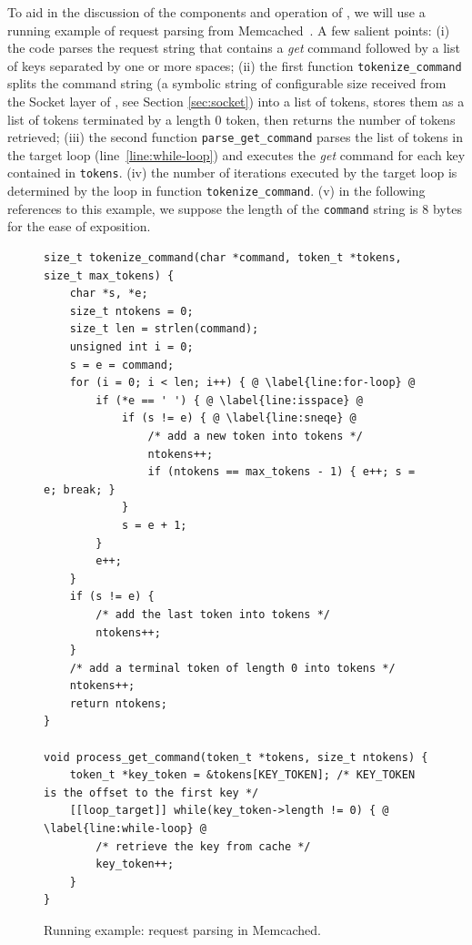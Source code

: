 To aid in the discussion of the components and operation of \lancet, we will use a running example of request parsing from Memcached~\cite{memcached}. A few salient points:
(i) the code parses the request string that contains a {\em get} command followed by a list of keys separated by one or more spaces;
(ii) the first function {\tt tokenize\_command} splits the command string (a symbolic string of configurable size received from the Socket layer of \lancet, see Section \ref{sec:socket}) into a list of tokens, stores them as a list of tokens terminated by a length 0 token, then returns the number of tokens retrieved;
(iii) the second function {\tt parse\_get\_command} parses the list of tokens in the target loop (line~\ref{line:while-loop}) and executes the {\em get} command for each key contained in {\tt tokens}.
(iv) the number of iterations executed by the target loop is determined by the loop in function {\tt tokenize\_command}.
(v) in the following references to this example, we suppose the length of the {\tt command} string is 8 bytes for the ease of exposition.

\begin{figure}[tbp]
\centering
\begin{lstlisting}
size_t tokenize_command(char *command, token_t *tokens, size_t max_tokens) {
    char *s, *e;
    size_t ntokens = 0;
    size_t len = strlen(command);
    unsigned int i = 0;
    s = e = command;
    for (i = 0; i < len; i++) { @ \label{line:for-loop} @
        if (*e == ' ') { @ \label{line:isspace} @
            if (s != e) { @ \label{line:sneqe} @
                /* add a new token into tokens */
                ntokens++;
                if (ntokens == max_tokens - 1) { e++; s = e; break; }
            }
            s = e + 1;
        }
        e++;
    }
    if (s != e) {
        /* add the last token into tokens */
        ntokens++;
    }
    /* add a terminal token of length 0 into tokens */
    ntokens++;
    return ntokens;
}

void process_get_command(token_t *tokens, size_t ntokens) {
    token_t *key_token = &tokens[KEY_TOKEN]; /* KEY_TOKEN is the offset to the first key */
    [[loop_target]] while(key_token->length != 0) { @ \label{line:while-loop} @
        /* retrieve the key from cache */
        key_token++;
    }
}
\end{lstlisting}
\caption{Running example: request parsing in Memcached.}
\label{fig:example}
\end{figure}

